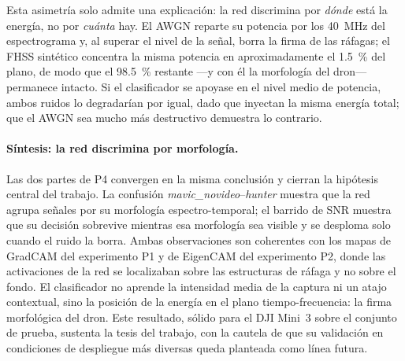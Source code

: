 Esta asimetría solo admite una explicación: la red discrimina por \emph{dónde} está la energía, no por \emph{cuánta} hay. El AWGN reparte su potencia por los \SI{40}{\mega\hertz} del espectrograma y, al superar el nivel de la señal, borra la firma de las ráfagas; el FHSS sintético concentra la misma potencia en aproximadamente el \SI{1,5}{\percent} del plano, de modo que el \SI{98,5}{\percent} restante ---y con él la morfología del dron--- permanece intacto. Si el clasificador se apoyase en el nivel medio de potencia, ambos ruidos lo degradarían por igual, dado que inyectan la misma energía total; que el AWGN sea mucho más destructivo demuestra lo contrario.

\paragraph{Síntesis: la red discrimina por morfología.}
Las dos partes de P4 convergen en la misma conclusión y cierran la hipótesis central del trabajo. La confusión \emph{mavic\_novideo}--\emph{hunter} muestra que la red agrupa señales por su morfología espectro-temporal; el barrido de SNR muestra que su decisión sobrevive mientras esa morfología sea visible y se desploma solo cuando el ruido la borra. Ambas observaciones son coherentes con los mapas de GradCAM del experimento P1 y de EigenCAM del experimento P2, donde las activaciones de la red se localizaban sobre las estructuras de ráfaga y no sobre el fondo. El clasificador no aprende la intensidad media de la captura ni un atajo contextual, sino la posición de la energía en el plano tiempo-frecuencia: la firma morfológica del dron. Este resultado, sólido para el DJI Mini~3 sobre el conjunto de prueba, sustenta la tesis del trabajo, con la cautela de que su validación en condiciones de despliegue más diversas queda planteada como línea futura.
